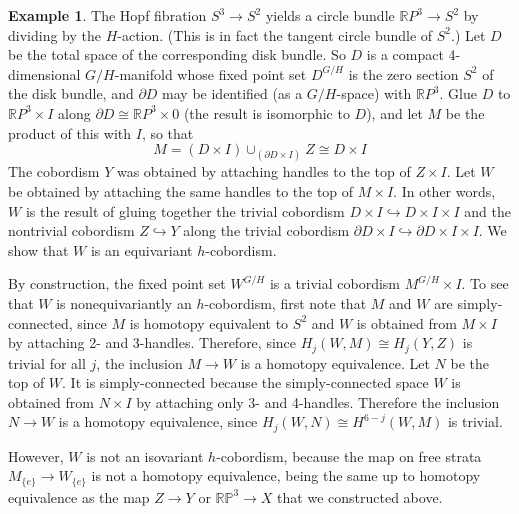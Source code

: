 \documentclass[11pt]{amsart}
\theoremstyle{definition}
\newtheorem{exmp}{Example}[section]
\numberwithin{equation}{section}
\numberwithin{figure}{section}
\newcommand{\R}{\mathbb R}
\newcommand{\Z}{\mathbb Z}
\begin{document}
\begin{exmp}
The Hopf fibration $S^3\to S^2$ yields a circle bundle $\R P^3\to S^2$ by dividing by the $H$-action. (This is in fact the tangent circle bundle of $S^2$.) Let $D$ be the total space of the corresponding disk bundle. So $D$ is a compact 4-dimensional $G/H$-manifold whose fixed point set $D^{G/H}$ is the zero section $S^2$ of the disk bundle, and $\partial D$ may be identified (as a $G/H$-space) with $\R P^3$. Glue $D$ to $\R P^3\times I$ along $\partial D\cong \R P^3\times 0$ (the result is isomorphic to $D$), and let $M$ be the product of this with $I$, so that 
$$M = (D \times I) \cup_{(\partial D\times I)} Z\cong D\times I$$
The cobordism $Y$ was obtained by attaching handles to the top of $Z\times I$.  Let $W$ be obtained by attaching the same handles to the top of $M\times I$. In other words, $W$ is the result of gluing together the trivial cobordism $D \times I \hookrightarrow D \times I\times I$ and the nontrivial cobordism $Z \hookrightarrow Y$ along the trivial cobordism $\partial D\times I\hookrightarrow \partial D\times I\times I$. We show that $W$ is an equivariant $h$-cobordism. 

By construction, the fixed point set $W^{G/H}$ is a trivial cobordism $M^{G/H}\times I$. To see that $W$ is nonequivariantly an $h$-cobordism, first note that $M$ and $W$ are simply-connected, since $M$ is homotopy equivalent to $S^2$ and $W$ is obtained from $M\times I$ by attaching 2- and 3-handles. Therefore, since $H_j(W,M)\cong H_j(Y,Z)$ is trivial for all $j$, the inclusion $M\to W$ is a homotopy equivalence. Let $N$ be the top of $W$. It is simply-connected because the simply-connected space $W$ is obtained from $N\times I$ by attaching only 3- and 4-handles. Therefore the inclusion $N\to W$ is a homotopy equivalence, since $H_j(W,N)\cong H^{6-j}(W,M)$ is trivial.  

However, $W$ is not an isovariant $h$-cobordism, because the map on free strata $M_{\{e\}} \to W_{\{e\}}$ is not a homotopy equivalence, being
the same up to homotopy equivalence as the map $ Z\to Y$ or $\mathbb{RP}^3 \to X$ that we constructed above.

	
	

\end{exmp}
\end{document}
